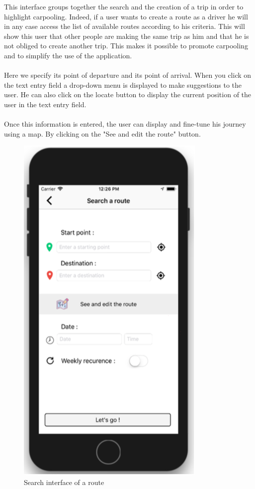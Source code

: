 This interface groups together the search and the creation of a trip in order to highlight carpooling. Indeed, if a user wants to create a route as a driver he will in any case access the list of available routes according to his criteria. This will show this user that other people are making the same trip as him and that he is not obliged to create another trip. This makes it possible to promote carpooling and to simplify the use of the application.
\\\\
Here we specify its point of departure and its point of arrival. When you click on the text entry field a drop-down menu is displayed to make suggestions to the user. He can also click on the locate button to display the current position of the user in the text entry field.
\\\\
Once this information is entered, the user can display and fine-tune his journey using a map. By clicking on the "See and edit the route" button.

\newpage

\begin{figure}[h!]
\begin{center}
\includegraphics[scale = 0.3]{diagrams/SearchInterfaceRoute.png} 
\end{center}
\caption{Search interface of a route}
\end{figure}

